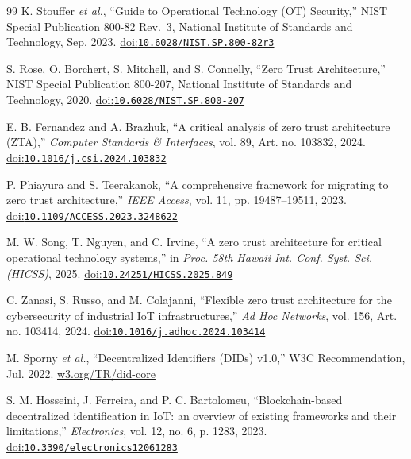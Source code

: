 \begin{thebibliography}{99}\fontsize{7.5}{8.8}\selectfont
\setlength{\itemsep}{0pt}
\setlength{\parskip}{0pt}
\fontsize{7.5}{8.8}\selectfont
\setlength{\itemsep}{0pt}
\setlength{\parskip}{0pt}
K. Stouffer \emph{et al.}, ``Guide to Operational Technology (OT) Security,'' NIST Special Publication 800-82 Rev.~3, National Institute of Standards and Technology, Sep. 2023. \href{https://doi.org/10.6028/NIST.SP.800-82r3}{doi:\nolinkurl{10.6028/NIST.SP.800-82r3}}

S. Rose, O. Borchert, S. Mitchell, and S. Connelly, ``Zero Trust Architecture,'' NIST Special Publication 800-207, National Institute of Standards and Technology, 2020. \href{https://doi.org/10.6028/NIST.SP.800-207}{doi:\nolinkurl{10.6028/NIST.SP.800-207}}

E. B. Fernandez and A. Brazhuk, ``A critical analysis of zero trust architecture (ZTA),'' \emph{Computer Standards \& Interfaces}, vol. 89, Art. no. 103832, 2024. \href{https://doi.org/10.1016/j.csi.2024.103832}{doi:\nolinkurl{10.1016/j.csi.2024.103832}}

P. Phiayura and S. Teerakanok, ``A comprehensive framework for migrating to zero trust architecture,'' \emph{IEEE Access}, vol. 11, pp. 19487--19511, 2023. \href{https://doi.org/10.1109/ACCESS.2023.3248622}{doi:\nolinkurl{10.1109/ACCESS.2023.3248622}}

M. W. Song, T. Nguyen, and C. Irvine, ``A zero trust architecture for critical operational technology systems,'' in \emph{Proc. 58th Hawaii Int. Conf. Syst. Sci. (HICSS)}, 2025. \href{https://doi.org/10.24251/HICSS.2025.849}{doi:\nolinkurl{10.24251/HICSS.2025.849}}

C. Zanasi, S. Russo, and M. Colajanni, ``Flexible zero trust architecture for the cybersecurity of industrial IoT infrastructures,'' \emph{Ad Hoc Networks}, vol. 156, Art. no. 103414, 2024. \href{https://doi.org/10.1016/j.adhoc.2024.103414}{doi:\nolinkurl{10.1016/j.adhoc.2024.103414}}

M. Sporny \emph{et al.}, ``Decentralized Identifiers (DIDs) v1.0,'' W3C Recommendation, Jul. 2022. \href{https://www.w3.org/TR/did-core/}{w3.org/TR/did-core}

S. M. Hosseini, J. Ferreira, and P. C. Bartolomeu, ``Blockchain-based decentralized identification in IoT: an overview of existing frameworks and their limitations,'' \emph{Electronics}, vol. 12, no. 6, p. 1283, 2023. \href{https://doi.org/10.3390/electronics12061283}{doi:\nolinkurl{10.3390/electronics12061283}}


\end{thebibliography}
